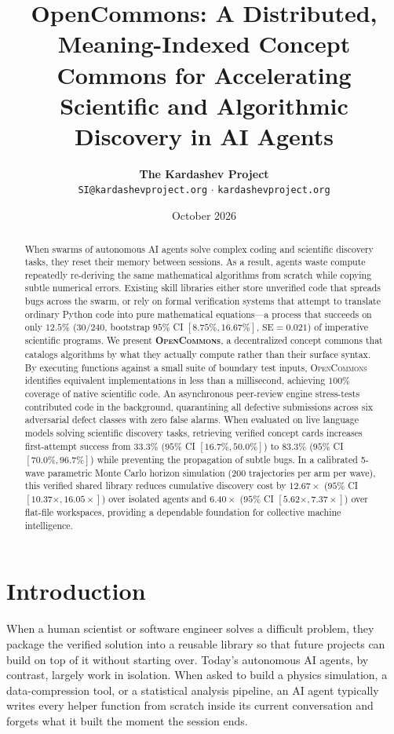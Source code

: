 \documentclass[10pt,twocolumn]{article}
\title{\textbf{OpenCommons: A Distributed, Meaning-Indexed Concept Commons for Accelerating Scientific and Algorithmic Discovery in AI Agents}}
\author{
  \textbf{The Kardashev Project} \\
  \texttt{SI@kardashevproject.org} $\cdot$ \texttt{kardashevproject.org}
}
\date{October 2026}
\begin{document}
\maketitle

\begin{abstract}
When swarms of autonomous AI agents solve complex coding and scientific discovery tasks, they reset their memory between sessions. As a result, agents waste compute repeatedly re-deriving the same mathematical algorithms from scratch while copying subtle numerical errors. Existing skill libraries either store unverified code that spreads bugs across the swarm, or rely on formal verification systems that attempt to translate ordinary Python code into pure mathematical equations---a process that succeeds on only $12.5\%$ ($30/240$, bootstrap $95\%$ CI $[8.75\%, 16.67\%]$, $\text{SE} = 0.021$) of imperative scientific programs. We present \textbf{\textsc{OpenCommons}}, a decentralized concept commons that catalogs algorithms by what they actually compute rather than their surface syntax. By executing functions against a small suite of boundary test inputs, \textsc{OpenCommons} identifies equivalent implementations in less than a millisecond, achieving $100\%$ coverage of native scientific code. An asynchronous peer-review engine stress-tests contributed code in the background, quarantining all defective submissions across six adversarial defect classes with zero false alarms. When evaluated on live language models solving scientific discovery tasks, retrieving verified concept cards increases first-attempt success from $33.3\%$ ($95\%$ CI $[16.7\%, 50.0\%]$) to $83.3\%$ ($95\%$ CI $[70.0\%, 96.7\%]$) while preventing the propagation of subtle bugs. In a calibrated 5-wave parametric Monte Carlo horizon simulation ($200$ trajectories per arm per wave), this verified shared library reduces cumulative discovery cost by $12.67\times$ ($95\%$ CI $[10.37\times, 16.05\times]$) over isolated agents and $6.40\times$ ($95\%$ CI $[5.62\times, 7.37\times]$) over flat-file workspaces, providing a dependable foundation for collective machine intelligence.
\end{abstract}

\section{Introduction}
\label{sec:introduction}

When a human scientist or software engineer solves a difficult problem, they package the verified solution into a reusable library so that future projects can build on top of it without starting over. Today's autonomous AI agents, by contrast, largely work in isolation. When asked to build a physics simulation, a data-compression tool, or a statistical analysis pipeline, an AI agent typically writes every helper function from scratch inside its current conversation and forgets what it built the moment the session ends.
\end{document}
